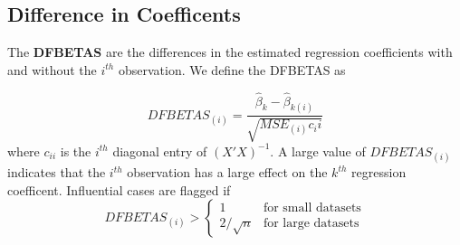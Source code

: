 \subsection{Difference in Coefficents}

The \textbf{DFBETAS} are the differences in the estimated regression coefficients with and without the $i^{th}$ observation. We define the DFBETAS as

\[DFBETAS_{(i)} = \frac{\hat{\beta}_k - \hat{\beta}_{k(i)}}{\sqrt{MSE_{(i)}c_ii}}\]
where $c_{ii}$ is the $i^{th}$ diagonal entry of $(X'X)^{-1}$. A large value of $DFBETAS_{(i)}$ indicates that the $i^{th}$ observation has a large effect on the $k^{th}$ regression coefficent. Influential cases are flagged if
\[DFBETAS_{(i)} > \begin{cases}
    1 & \text{for small datasets} \\
    2/\sqrt{n} & \text{for large datasets}
\end{cases}\]
